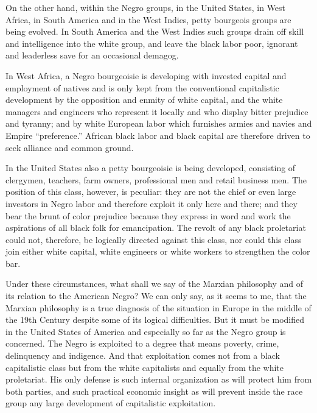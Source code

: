 \documentclass[letterpaper,10pt,english]{jupyterBook}
\begin{document}
\sphinxAtStartPar
On the other hand, within the Negro groups, in the United States, in West Africa, in South America and in the West Indies, petty bourgeois groups are being evolved. In South America and the West Indies such groups drain off skill and intelligence into the white group, and leave the black labor poor, ignorant and leaderless save for an occasional demagog.

\sphinxAtStartPar
In West Africa, a Negro bourgeoisie is developing with invested capital and employment of natives and is only kept from the conventional capitalistic development by the opposition and enmity of white capital, and the white managers and engineers who represent it locally and who display bitter prejudice and tyranny; and by white European labor which furnishes armies and navies and Empire “preference.” African black labor and black capital are therefore driven to seek alliance and common ground.

\sphinxAtStartPar
In the United States also a petty bourgeoisie is being developed, consisting of clergymen, teachers, farm owners, professional men and retail business men. The position of this class, however, is peculiar: they are not the chief or even large investors in Negro labor and therefore exploit it only here and there; and they bear the brunt of color prejudice because they express in word and work the aspirations of all black folk for emancipation. The revolt of any black proletariat could not, therefore, be logically directed against this class, nor could this class join either white capital, white engineers or white workers to strengthen the color bar.

\sphinxAtStartPar
Under these circumstances, what shall we say of the Marxian philosophy and of its relation to the American Negro? We can only say, as it seems to me, that the Marxian philosophy is a true diagnosis of the situation in Europe in the middle of the 19th Century despite some of its logical difficulties. But it must be modified in the United States of America and especially so far as the Negro group is concerned. The Negro is exploited to a degree that means poverty, crime, delinquency and indigence. And that exploitation comes not from a black capitalistic class but from the white capitalists and equally from the white proletariat. His only defense is such internal organization as will protect him from both parties, and such practical economic insight as will prevent inside the race group any large development of capitalistic exploitation.
\end{document}
